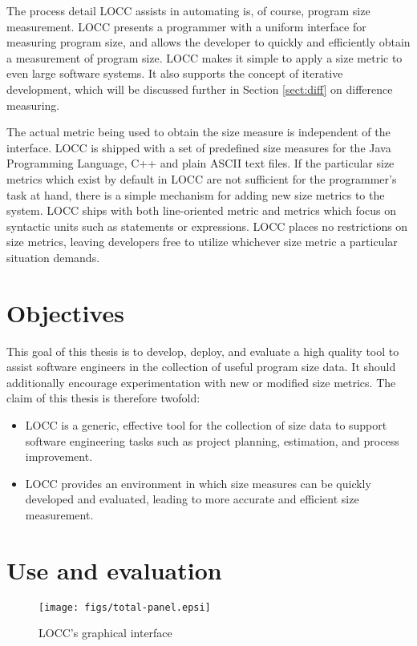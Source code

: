The process detail LOCC assists in automating is, of course, program
size measurement.  LOCC presents a programmer with a uniform interface for
measuring program size, and allows the developer to quickly and
efficiently obtain a measurement of program size.  LOCC makes it
simple to apply a size metric to even large software systems.  It also 
supports the concept of iterative development, which will be discussed 
further in Section \ref{sect:diff} on difference measuring.

The actual metric being used to obtain the size measure is independent
of the interface.  LOCC is shipped with a set of predefined size
measures for the Java Programming Language, C++ and plain ASCII text
files.  If the particular size metrics which exist by default in LOCC
are not sufficient for the programmer's task at hand, there is a simple
mechanism for adding new size metrics to the system.  LOCC ships with both
line-oriented metric and metrics which focus on syntactic units such as
statements or expressions.  LOCC places no
restrictions on size metrics, leaving developers free to utilize
whichever size metric a particular situation demands.


\section{Objectives}

This goal of this thesis is to develop, deploy, and evaluate a high quality
tool to assist software engineers in the collection
of useful program size data.  It should additionally encourage
experimentation with new or modified size metrics. The claim of this thesis
is therefore twofold:

\begin{itemize}
  \em
  \item
    LOCC is a generic, effective tool for the collection of size data
    to support software engineering tasks such as project planning,
    estimation, and process improvement. 
  \item
    LOCC provides an environment in which size measures can be quickly 
    developed and evaluated, leading to more accurate and efficient
    size measurement.
\end{itemize}

\section{Use and evaluation}

\begin{figure}
  \centering
  \texttt{[image: figs/total-panel.epsi]}
  \caption{LOCC's graphical interface}
  \label{fig:total-panel1}
\end{figure}

